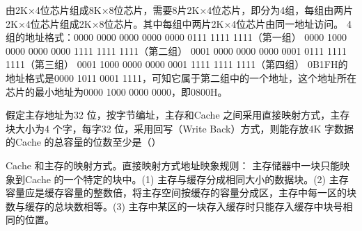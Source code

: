 \begin{solution}由2K×4位芯片组成8K×8位芯片，需要8片2K×4位芯片，即分为4组，每组由两片2K×4位芯片组成2K×8位芯片。其中每组中两片2K×4位芯片由同一地址访问。
4组的地址格式：0000 0000 0000 0000 0000 0111 1111 1111（第一组） 0000
1000 0000 0000 0000 1111 1111 1111（第二组） 0001 0000 0000 0000 0001
0111 1111 1111（第三组） 0001 1000 0000 0000 0001 1111 1111
1111（第四组） 0B1FH的地址格式是0000 1011 0001
1111，可知它属于第二组中的一个地址，这个地址所在芯片的最小地址为0000
1000 0000 0000，即0800H。
\end{solution}
\question 假定主存地址为32 位，按字节编址，主存和Cache
之间采用直接映射方式，主存块大小为4 个字，每字32 位，采用回写（Write
Back）方式，则能存放4K 字数据的Cache 的总容量的位数至少是（）
\par{}
\begin{solution}Cache 和主存的映射方式。直接映射方式地址映象规则：
主存储器中一块只能映象到Cache 的一个特定的块中。(1)
主存与缓存分成相同大小的数据块。(2)
主存容量应是缓存容量的整数倍，将主存空间按缓存的容量分成区，主存中每一区的块数与缓存的总块数相等。(3)
主存中某区的一块存入缓存时只能存入缓存中块号相同的位置。
\end{solution}
